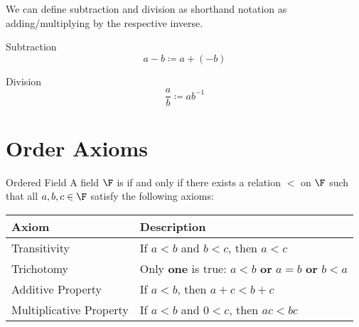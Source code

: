 \documentclass[letterpaper,12pt]{report}
\begin{document}

\iffalse
\begin{thmbox}{Consequences of Field Axioms}{}
	Let $\F$ be a field. The following statements hold for all $a,b \in \F$.
	\begin{itemize}
		\item $0 \cdot a = 0$.
		\item If $ab = 0$, then $a = 0$ or $b = 0$.
		\item $-(-a) = a$ and $-(a+b) = (-a) + (-b)$.
		\item If $a \neq 0$ and $b \neq 0$, then $(a^{-1})^{-1} = a$, and $(ab)^{-1} = a^{-1}b^{-1}$
		\item $-(a^{-1}) = (-a)^{-1}$ (i.e. inverse operations commute).
	\end{itemize}
	\tcblower
	\textbf{Note:} None of these are strictly given by the axioms, but rather, they are proven as a consequence of the field axioms.
\end{thmbox}
\fi

We can define subtraction and division as shorthand notation as adding/multiplying by the respective inverse.

\begin{dfnbox}{Subtraction}{}
	\[ a - b \coloneq a + (-b) \]
\end{dfnbox}

\begin{dfnbox}{Division}{}
	\[ \frac{a}{b} \coloneq a b^{-1} \]
\end{dfnbox}

\section{Order Axioms}

\begin{dfnbox}{Ordered Field}{}
	A field $\F$ is  if and only if there exists a relation $<$ on $\F$ such that all $a,b,c \in \F$ satisfy the following axioms:

	\begin{center}\begin{tabular}{ll}
		Axiom & Description \\ \hline
		Transitivity & If $a<b$ and $b<c$, then $a<c$ \\
		Trichotomy & Only \textbf{one} is true: $a<b$ \textbf{or} $a=b$ \textbf{or} $b<a$ \\
		Additive Property & If $a<b$, then $a+c < b+c$ \\
		Multiplicative Property & If $a<b$ and $0<c$, then $ac < bc$
	\end{tabular}\end{center}
\end{dfnbox}
\end{document}
